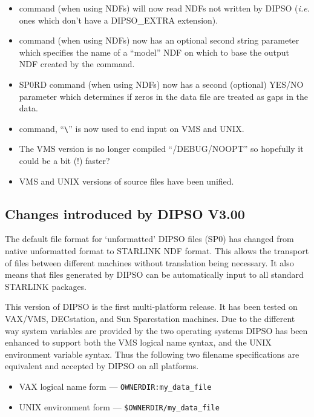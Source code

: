 \begin{itemize}
\item {}  command (when using NDFs) will now read NDFs not written by
DIPSO ({\em i.e.} ones which don't have a DIPSO\_EXTRA extension).

\item {}  command (when using NDFs) now has an optional second string
parameter which specifies the name of a ``model'' NDF on which to base
the output NDF created by the   command.

\item SP0RD command (when using NDFs) now has a second (optional)
YES/NO parameter which determines if zeros in the data file are treated
as gaps in the data.

\item {}  command, ``\verb+\+'' is now used to end input on VMS
and UNIX.

\item The VMS version is no longer compiled ``/DEBUG/NOOPT'' so
hopefully it could be a bit (!) faster?

\item VMS and UNIX versions of source files have been unified.

\end{itemize}

\subsection{ Changes introduced by DIPSO V3.00}

The default file format for `unformatted' DIPSO files (SP0) has
changed from native unformatted format to STARLINK NDF format. This
allows the transport of files between different machines without
translation being necessary. It also means that files generated by
DIPSO can be automatically input to all standard STARLINK packages.

This version of DIPSO is the first multi-platform release. It has been
tested on VAX/VMS, DECstation, and Sun Sparcstation machines.
Due to the different way system variables are provided by the two
operating systems DIPSO has been enhanced to support both the VMS
logical name syntax, and the UNIX environment variable syntax. Thus
the following two filename specifications are equivalent and accepted
by DIPSO on all platforms.

\begin{itemize}
\item{VAX logical name form --- {\tt{OWNERDIR:my\_data\_file}}} 
\item{UNIX environment form --- {\tt{\$OWNERDIR/my\_data\_file}}} 
\end{itemize}

